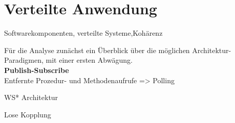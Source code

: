 
\section{Verteilte Anwendung}



Softwarekomponenten, verteilte Systeme,Kohärenz


Für die Analyse zunächst ein Überblick über die möglichen Architektur-Paradigmen, mit einer ersten Abwägung.\\

\textbf{Publish-Subscribe}\\


Entfernte Prozedur- und Methodenaufrufe => Polling

WS* Architektur


Lose Kopplung
